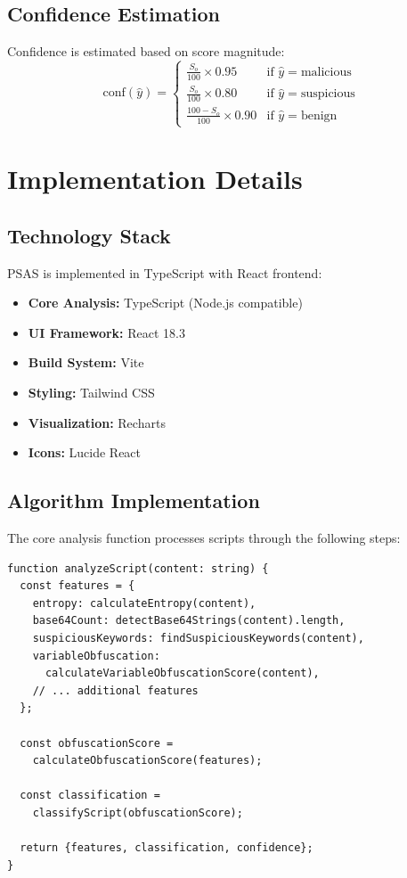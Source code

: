 \documentclass[10pt,conference,a4paper]{IEEEtran}
\begin{document}
\subsection{Confidence Estimation}

Confidence is estimated based on score magnitude:
\begin{equation}
\text{conf}(\hat{y}) = \begin{cases}
\frac{S_o}{100} \times 0.95 & \text{if } \hat{y} = \text{malicious} \\
\frac{S_o}{100} \times 0.80 & \text{if } \hat{y} = \text{suspicious} \\
\frac{100 - S_o}{100} \times 0.90 & \text{if } \hat{y} = \text{benign}
\end{cases}
\label{eq:confidence}
\end{equation}

\section{Implementation Details}

\subsection{Technology Stack}

PSAS is implemented in TypeScript with React frontend:

\begin{itemize}
\item \textbf{Core Analysis:} TypeScript (Node.js compatible)
\item \textbf{UI Framework:} React 18.3
\item \textbf{Build System:} Vite
\item \textbf{Styling:} Tailwind CSS
\item \textbf{Visualization:} Recharts
\item \textbf{Icons:} Lucide React
\end{itemize}

\subsection{Algorithm Implementation}

The core analysis function processes scripts through the following steps:

\lstset{language=TypeScript, basicstyle=\small, breaklines=true}
\begin{lstlisting}
function analyzeScript(content: string) {
  const features = {
    entropy: calculateEntropy(content),
    base64Count: detectBase64Strings(content).length,
    suspiciousKeywords: findSuspiciousKeywords(content),
    variableObfuscation:
      calculateVariableObfuscationScore(content),
    // ... additional features
  };

  const obfuscationScore =
    calculateObfuscationScore(features);

  const classification =
    classifyScript(obfuscationScore);

  return {features, classification, confidence};
}
\end{lstlisting}
\end{document}
